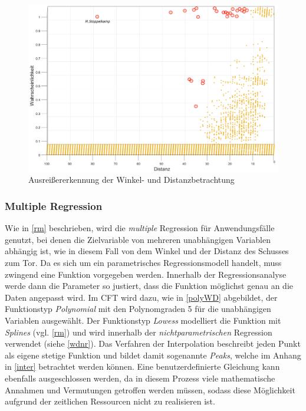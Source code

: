 \begin{figure}[H]
\centering
\includegraphics[scale=0.33]{se-wa-jpg/outlierWD}
\caption{Ausreißererkennung der Winkel- und Distanzbetrachtung}
\label{outlierWD}
\end{figure}

\subsubsection{Multiple Regression}
Wie in \vref{rm} beschrieben, wird die \textit{multiple} Regression für Anwendungsfälle genutzt, bei denen die Zielvariable von mehreren unabhängigen Variablen abhängig ist, wie in diesem Fall von dem Winkel und der Distanz des Schusses zum Tor. Da es sich um ein parametrisches Regressionsmodell handelt, muss zwingend eine Funktion vorgegeben werden. Innerhalb der Regressionsanalyse werde dann die Parameter so justiert, dass die Funktion möglichst genau an die Daten angepasst wird. Im CFT wird dazu, wie in \vref{polyWD} abgebildet, der Funktionstyp \textit{Polynomial} mit den Polynomgraden \textsf{5} für die unabhängigen Variablen ausgewählt. Der Funktionstyp \textit{Lowess} modelliert die Funktion mit \textit{Splines} (vgl. \vref{rm}) und wird innerhalb der \textit{nichtparametrischen} Regression verwendet (siehe \vref{wdnr}). Das Verfahren der Interpolation beschreibt jeden Punkt als eigene stetige Funktion und bildet damit sogenannte \textit{Peaks}, welche im Anhang in \vref{inter} betrachtet werden können. Eine benutzerdefinierte Gleichung kann ebenfalls ausgeschlossen werden, da in diesem Prozess viele mathematische Annahmen und Vermutungen getroffen werden müssen, sodass diese Möglichkeit aufgrund der zeitlichen Ressourcen nicht zu realisieren ist.

